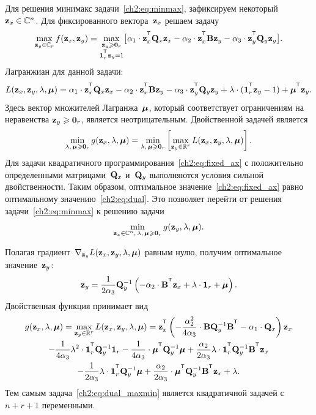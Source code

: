 Для решения минимакс задачи~\eqref{ch2:eq:minmax}, зафиксируем некоторый~$\mathbf{z}_x \in \mathbb{C}^n$. Для фиксированного вектора~$\mathbf{z}_x$ решаем задачу
\begin{equation}
\max_{\bz_y \in \mathbb{C}_r} f(\bz_x, \bz_y) = \max_{\substack{\bz_y \geq \bZero_r \\ \bOne_r^{\T}\bz_y=1}} \bigl[\alpha_1 \cdot \bz_x^{\T} \bQ_x \bz_x - \alpha_2 \cdot \bz_x^{\T} \bB \bz_y - \alpha_3 \cdot \bz_y^{\T} \bQ_y \bz_y \bigr].
\label{ch2:eq:fixed_ax}
\end{equation}
Лагранжиан для данной задачи:
\begin{equation*}
L(\bz_x, \bz_y, \lambda, \bmu) = \alpha_1 \cdot \bz_x^{\T} \bQ_x \bz_x - \alpha_2 \cdot \bz_x^{\T} \bB \bz_y - \alpha_3 \cdot \bz_y^{\T} \bQ_y \bz_y + \lambda \cdot  (\bOne_r^{\T} \bz_y - 1) + \bmu^{\T} \bz_y.
\end{equation*}
Здесь вектор множителей Лагранжа~$\boldsymbol{\mu}$, который соответствует ограничениям на неравенства $\mathbf{z}_y \geqslant \boldsymbol{0}_r$, является неотрицательным.
Двойственной задачей является
\begin{equation}
\min_{\lambda, \, \boldsymbol{\mu} \geqslant \boldsymbol{0}_r} g(\mathbf{z}_x, \lambda, \boldsymbol{\mu}) = \min_{\lambda, \, \boldsymbol{\mu} \geqslant \boldsymbol{0}_r}  \left[\max_{\mathbf{z}_y \in \mathbb{R}^r} L(\mathbf{z}_x, \mathbf{z}_y, \lambda, \boldsymbol{\mu}) \right].
\label{ch2:eq:dual}
\end{equation}
Для задачи квадратичного программирования~\eqref{ch2:eq:fixed_ax} с положительно определенными матрицами~$\mathbf{Q}_x$ и~$\mathbf{Q}_y$ выполняются условия сильной двойственности. Таким образом, оптимальное значение~\eqref{ch2:eq:fixed_ax} равно оптимальному значению~\eqref{ch2:eq:dual}. Это позволяет перейти от решения задачи~\eqref{ch2:eq:minmax} к решению задачи
\begin{equation}
\min_{\mathbf{z}_x \in \mathbb{C}^n, \, \lambda, \, \boldsymbol{\mu} \geqslant \boldsymbol{0}_r} g(\mathbf{z}_y, \lambda, \boldsymbol{\mu}).
\label{ch2:eq:dual_maxmin}
\end{equation}

Полагая градиент~$\nabla_{\mathbf{z}_y} L(\mathbf{z}_x, \mathbf{z}_y, \lambda, \boldsymbol{\mu})$ равным нулю, получим оптимальное значение~$\mathbf{z}_y$:
\begin{equation}
\bz_y = \frac{1}{2\alpha_3} \bQ_y^{-1} \left( - \alpha_2 \cdot \bB^{\T} \bz_x +\lambda \cdot \bOne_r + \bmu \right).
\label{ch2:eq:ax}
\end{equation}
Двойственная функция принимает вид
\begin{multline}
g(\bz_x, \lambda, \bmu)
= \max_{\bz_y \in \bbR^r} L(\bz_x, \bz_y, \lambda, \bmu) =
\bz_x^{\T} \left( - \frac{\alpha_2^2}{4\alpha_3} \cdot \bB \bQ_y^{-1} \bB^{\T} - \alpha_1 \cdot \bQ_x\right) \bz_x \\ - \frac{1}{4 \alpha_3} \lambda^2 \cdot \bOne_r^{\T} \bQ_y^{-1} \bOne_r - \frac{1}{4 \alpha_3} \cdot \bmu^{\T} \bQ_y^{-1} \bmu + \frac{\alpha_2}{2 \alpha_3} \lambda \cdot \bOne_r^{\T} \bQ_y^{-1} \bB^{\T} \bz_x \\ - \frac{1}{2 \alpha_3} \lambda \cdot \bOne_r^{\T} \bQ_y^{-1} \bmu + \frac{\alpha_2}{2 \alpha_3} \cdot \bmu^{\T} \bQ_y^{-1} \bB^{\T} \bz_x + \lambda.
\label{ch2:eq:dual_quadratic_form}
\end{multline}
Тем самым задача~\eqref{ch2:eq:dual_maxmin} является квадратичной задачей с~$n + r + 1$ переменными.


